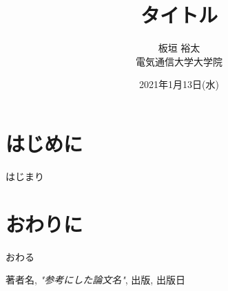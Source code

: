 \documentclass[uplatex, twocolumn,10pt]{jsbook}
\begin{document}
\title{タイトル}
\author{板垣 裕太\\電気通信大学大学院}
\date{2021年1月13日(水)}
\maketitle


\section{はじめに}
はじまり

\section{おわりに}
おわる

\begin{thebibliography}{99}
     著者名, {\it "参考にした論文名"}, 出版, 出版日
\end{thebibliography}
\end{document}
